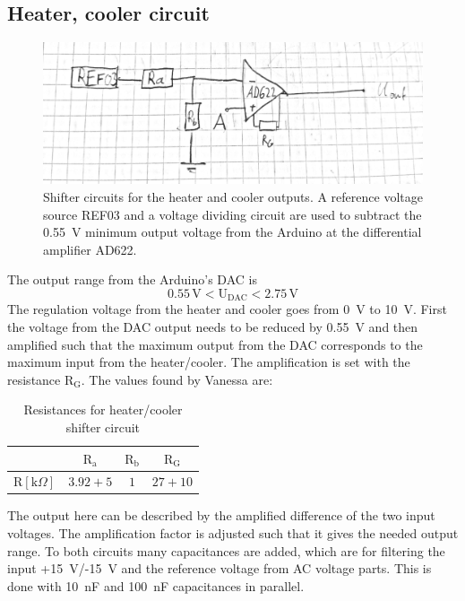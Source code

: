 \documentclass[12pt]{scrartcl}
\begin{document}
    \subsection{Heater, cooler circuit}
      \begin{figure}[H]
        \includegraphics[width = \textwidth]{circ2.png}
        \caption{Shifter circuits for the heater and cooler outputs. A reference
        voltage source REF03 and a voltage dividing circuit are used to subtract
        the 0.55~V minimum output voltage from the Arduino at the differential
        amplifier AD622.}
        \label{fig3}
      \end{figure}
      The output range from the Arduino's DAC is $$0.55\, \text{V} <
      \text{U}_{\text{DAC}} < 2.75\, \text{V}$$
      The regulation voltage from the heater and cooler goes from 0~V to 10~V. First the
      voltage from the DAC output needs to be reduced by 0.55~V and then amplified
      such that the maximum output from the DAC corresponds to the maximum input from
      the heater/cooler. The amplification is set with the resistance $\text{R}_\text{G}$.
      The values found by Vanessa are: \\
      \begin{table}[H]
        \begin{tabular}{l|c c c}
          & $\text{R}_\text{a}$ & $\text{R}_\text{b}$ & $\text{R}_\text{G}$ \\
          \hline\vspace{5pt}
          $\text{R}[\text{k}\Omega]$ & $3.92 + 5$ & $1$ & $27+10$
        \end{tabular}
        \flushleft \caption{Resistances for heater/cooler shifter circuit}
         \label{hcres}
      \end{table}
      \noindent The output here can be described by the amplified difference of the two
      input voltages. The amplification factor is adjusted such that it gives
      the needed output range.
      To both circuits many capacitances are added, which are for filtering
      the input +15~V/-15~V and the reference voltage from AC voltage parts. This is done with
      10~nF and 100~nF capacitances in parallel.
\end{document}
